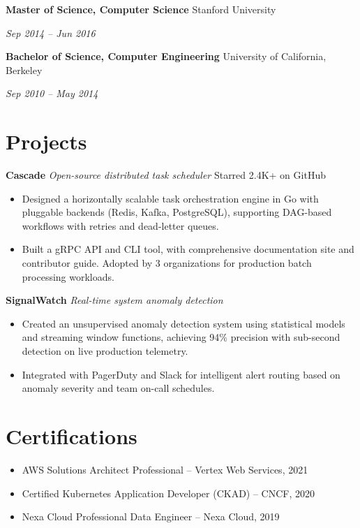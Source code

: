 \documentclass[11pt,letterpaper]{article}
\newcommand{\cventry}[3]{%
  \noindent
  {\bfseries #1} \hfill {\small\color{GrayRule} #2}\par
  \noindent
  {\itshape\color{PriBlue} #3}
}
\newcommand{\cvproject}[3]{%
  \noindent
  {\bfseries #1} \textbar{} {\itshape #2} \hfill {\small\color{GrayRule} #3}
}
\begin{document}
\cventry{Master of Science, Computer Science}{Stanford University}{Sep 2014 -- Jun 2016}
\vspace{6pt}
\vspace{8pt}

\cventry{Bachelor of Science, Computer Engineering}{University of California, Berkeley}{Sep 2010 -- May 2014}
\vspace{6pt}

\section{Projects}

\cvproject{Cascade}{Open-source distributed task scheduler}{Starred 2.4K+ on GitHub}
\vspace{2pt}
\begin{itemize}
  \item Designed a horizontally scalable task orchestration engine in Go with pluggable backends (Redis, Kafka, PostgreSQL), supporting DAG-based workflows with retries and dead-letter queues.
  \item Built a gRPC API and CLI tool, with comprehensive documentation site and contributor guide. Adopted by 3 organizations for production batch processing workloads.
\end{itemize}

\cvproject{SignalWatch}{Real-time system anomaly detection}{}
\vspace{2pt}
\begin{itemize}
  \item Created an unsupervised anomaly detection system using statistical models and streaming window functions, achieving 94\% precision with sub-second detection on live production telemetry.
  \item Integrated with PagerDuty and Slack for intelligent alert routing based on anomaly severity and team on-call schedules.
\end{itemize}

\section{Certifications}

\begin{itemize}
  \item AWS Solutions Architect Professional -- Vertex Web Services, 2021
  \item Certified Kubernetes Application Developer (CKAD) -- CNCF, 2020
  \item Nexa Cloud Professional Data Engineer -- Nexa Cloud, 2019
\end{itemize}
\end{document}
